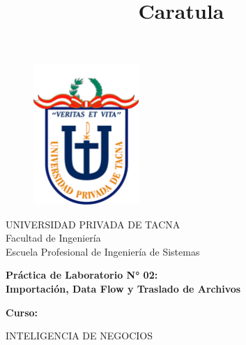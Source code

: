\documentclass[12pt,letterpaper]{article}
\begin{document}
%


\title{Caratula}

\begin{titlepage}
	\begin{center}
	
	\begin{figure}[htb]
	\begin{center}
	\includegraphics[width=4cm]{./Imagenes/UPT}
	\end{center}
	\end{figure}
	\vspace*{0.15in}
	\large{UNIVERSIDAD PRIVADA DE TACNA}\\
	\vspace*{0.10in}
	\large{Facultad de Ingeniería}\\
	\vspace*{0.10in}
	Escuela Profesional de Ingeniería de Sistemas  \\
	
\hfill \break
	
	\vspace*{0.1in}
	\begin{Large}
	\textbf{Práctica de Laboratorio N° 02: \\ Importación, Data Flow y Traslado de Archivos} \\
	\end{Large}
\hfill \break
	
	\vspace*{0.3in}
	\begin{Large}
	\textbf{Curso:} \\
	\end{Large}
	
	\vspace*{0.1in}
	\begin{large}
	INTELIGENCIA DE NEGOCIOS\\
	\end{large}
	

\end{center}
\end{titlepage}
\end{document}
